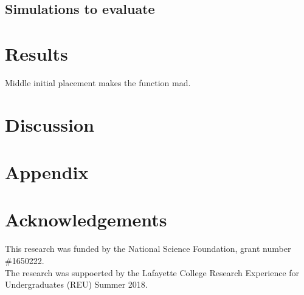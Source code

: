 \documentclass[submit]{smj}
\begin{document}
\subsection{Simulations to evaluate}

\section{Results}

Middle initial placement makes the function mad. 

\section{Discussion}

\section{Appendix}
\section*{Acknowledgements}
This research was funded by the National Science Foundation, grant number \#1650222.  \\
The research was suppoerted by the Lafayette College Research Experience for Undergraduates (REU) Summer 2018. 



\end{document}
